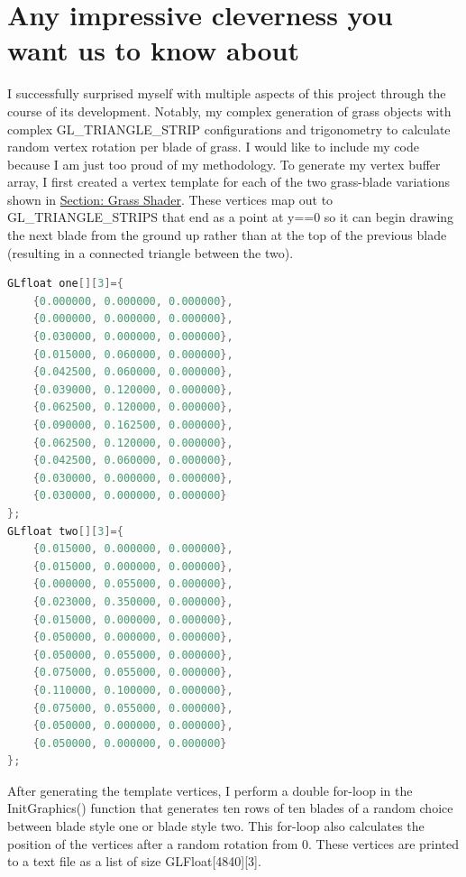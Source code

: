 \documentclass[journal,10pt,onecolumn,compsoc]{IEEEtran}
\begin{document}
\section{Any impressive cleverness you want us to know about}
\noindent I successfully surprised myself with multiple aspects of this project through the course of its development. Notably, my complex generation of grass objects with complex GL\_TRIANGLE\_STRIP configurations and trigonometry to calculate random vertex rotation per blade of grass. I would like to include my code because I am just too proud of my methodology.
\noindent To generate my vertex buffer array, I first created a vertex template for each of the two grass-blade variations shown in \hyperref[sec:grass]{Section: Grass Shader}. These vertices map out to GL\_TRIANGLE\_STRIPS that end as a point at y==0 so it can begin drawing the next blade from the ground up rather than at the top of the previous blade (resulting in a connected triangle between the two).
\tiny
\begin{lstlisting}[language=C++]
GLfloat one[][3]={
    {0.000000, 0.000000, 0.000000},
    {0.000000, 0.000000, 0.000000},
    {0.030000, 0.000000, 0.000000},
    {0.015000, 0.060000, 0.000000},
    {0.042500, 0.060000, 0.000000},
    {0.039000, 0.120000, 0.000000},
    {0.062500, 0.120000, 0.000000},
    {0.090000, 0.162500, 0.000000},
    {0.062500, 0.120000, 0.000000},
    {0.042500, 0.060000, 0.000000},
    {0.030000, 0.000000, 0.000000},
    {0.030000, 0.000000, 0.000000}
};
GLfloat two[][3]={
    {0.015000, 0.000000, 0.000000},
    {0.015000, 0.000000, 0.000000},
    {0.000000, 0.055000, 0.000000},
    {0.023000, 0.350000, 0.000000},
    {0.015000, 0.000000, 0.000000},
    {0.050000, 0.000000, 0.000000},
    {0.050000, 0.055000, 0.000000},
    {0.075000, 0.055000, 0.000000},
    {0.110000, 0.100000, 0.000000},
    {0.075000, 0.055000, 0.000000},
    {0.050000, 0.000000, 0.000000},
    {0.050000, 0.000000, 0.000000}
};
\end{lstlisting}
\normalsize
\noindent After generating the template vertices, I perform a double for-loop in the InitGraphics() function that generates ten rows of ten blades of a random choice between blade style one or blade style two. This for-loop also calculates the position of the vertices after a random rotation from 0\textdegree. These vertices are printed to a text file as a list of size GLFloat[4840][3].
\tiny
\end{document}
